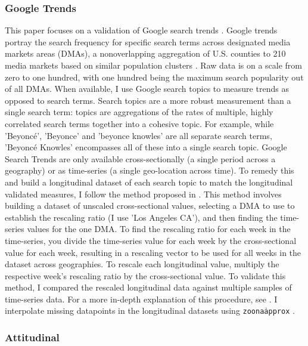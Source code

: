 \subsubsection{Google Trends}
This paper focuses on a validation of Google search trends \citep{googletrends}.
Google trends portray the search frequency for specific search terms across
designated media markets areas (DMAs), a nonoverlapping aggregation of U.S.
counties to 210 media markets based on similar population clusters \citep{dma_key}.
Raw data is on a scale from zero to one hundred, with one hundred being the maximum search
popularity out of all DMAs. When available, I use Google search topics to
measure trends as opposed to search terms. Search topics are a more robust
measurement than a single search term: topics are aggregations of the rates of
multiple, highly correlated search terms together into a cohesive topic. For
example, while 'Beyoncé', 'Beyonce' and 'beyonce knowles' are all separate
search terms, 'Beyoncé Knowles' encompasses all of these into a single search
topic. Google Search Trends are only available cross-sectionally (a single 
period across a geography) or as time-series (a single geo-location across
time). To remedy this and build a longitudinal dataset of each search topic 
to match the longitudinal validated measures, I follow the method proposed in \citet[p. 5]{park_etal}.
This method involves building a dataset of unscaled cross-sectional values,
selecting a DMA to use to establish the rescaling ratio (I use 'Los Angeles
CA'), and then finding the time-series values for the one DMA. To find the
rescaling ratio for each week in the time-series, you divide the time-series
value for each week by the cross-sectional value for each week, resulting in a
rescaling vector to be used for all weeks in the dataset across geographies. To
rescale each longitudinal value, multiply the respective week's rescaling ratio
by the cross-sectional value. To validate this method, I compared the rescaled
longitudinal data against multiple samples of time-series data. For a more
in-depth explanation of this procedure, see \citet[p. 5]{park_etal}. I interpolate 
missing datapoints in the longitudinal datasets using \texttt{zoo\:\:na\.approx\(\)} \citep{zoo}.

\subsubsection{Attitudinal}


